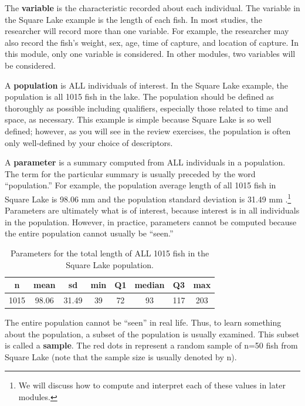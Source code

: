 \documentclass[10pt,openany]{book}\usepackage[]{graphicx}\usepackage[]{color}
\begin{document}
The \textbf{variable} is the characteristic recorded about each individual. The variable in the Square Lake example is the length of each fish. In most studies, the researcher will record more than one variable. For example, the researcher may also record the fish's weight, sex, age, time of capture, and location of capture. In this module, only one variable is considered. In other modules, two variables will be considered.

A \textbf{population} is ALL individuals of interest. In the Square Lake example, the population is all 1015 fish in the lake. The population should be defined as thoroughly as possible including qualifiers, especially those related to time and space, as necessary. This example is simple because Square Lake is so well defined; however, as you will see in the review exercises, the population is often only well-defined by your choice of descriptors.

A \textbf{parameter} is a summary computed from ALL individuals in a population.  The term for the particular summary is usually preceded by the word ``population.'' For example, the population average length of all 1015 fish in Square Lake is 98.06 mm and the population standard deviation is 31.49 mm .\footnote{We will discuss how to compute and interpret each of these values in later modules.} Parameters are ultimately what is of interest, because interest is in all individuals in the population. However, in practice, parameters cannot be computed because the entire population cannot usually be ``seen.''
\begin{table}[ht]
\centering
\caption{Parameters for the total length of ALL 1015 fish in the Square Lake population.} 
\label{tab:SquareLakePopn}
\begin{tabular}{cccccccc}
 n & mean & sd & min & Q1 & median & Q3 & max \\ 
  \hline
1015 & 98.06 & 31.49 & 39 & 72 & 93 & 117 & 203 \\ 
   \hline
\end{tabular}
\end{table}


The entire population cannot be ``seen'' in real life. Thus, to learn something about the population, a subset of the population is usually examined. This subset is called a \textbf{sample}. The red dots in  represent a random sample of n=50 fish from Square Lake (note that the sample size is usually denoted by n).
\end{document}
